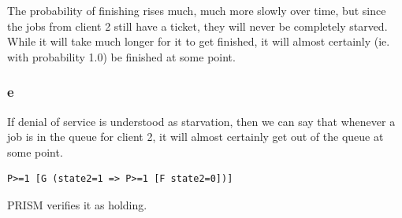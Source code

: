 The probability of finishing rises much, much more slowly over time,
but since the jobs from client 2 still have a ticket, they will never
be completely starved.
While it will take much longer for it to get finished, it will almost certainly (ie. with probability 1.0)
be finished at some point.

\subsubsection{e}

If denial of service is understood as starvation,
then we can say that whenever a job is in the queue for client 2,
it will almost certainly get out of the queue at some point.

\begin{verbatim}
P>=1 [G (state2=1 => P>=1 [F state2=0])]
\end{verbatim}

PRISM verifies it as holding.

